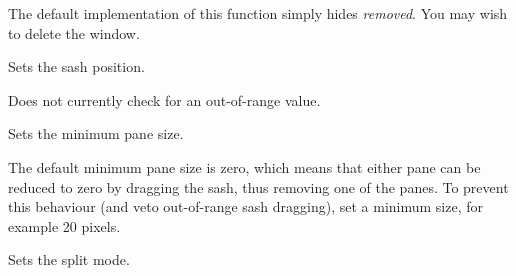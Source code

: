 


The default implementation of this function simply hides {\it removed}. You
may wish to delete the window.



\label{wxsplitterwndsetsashposition}


Sets the sash position.





Does not currently check for an out-of-range value.



\label{wxsplitterwndsetminimumpanesize}


Sets the minimum pane size.




The default minimum pane size is zero, which means that either pane can be reduced to zero by dragging
the sash, thus removing one of the panes. To prevent this behaviour (and veto out-of-range sash dragging),
set a minimum size, for example 20 pixels.



\label{wxsplitterwndsetsplitmode}


Sets the split mode.

